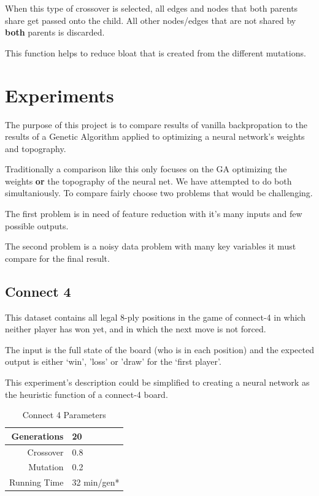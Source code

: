 \documentclass[journal]{IEEEtran}
\begin{document}
    When this type of crossover is selected, all edges and nodes that both parents share get
    passed onto the child. All other nodes/edges that are not shared by \textbf{both} parents
    is discarded. 
    
    This function helps to reduce bloat that is created from the different mutations.
    
\section{Experiments}
  The purpose of this project is to compare results of vanilla backpropation to the results of
  a Genetic Algorithm applied to optimizing a neural network's weights and topography. 
  
  Traditionally a comparison like this only focuses on the GA optimizing the weights \textbf{or}
  the topography of the neural net. We have attempted to do both simultaniously. To compare fairly
  choose two problems that would be challenging.
  
  The first problem is in need of feature reduction with it's many inputs and few possible outputs.
  
  The second problem is a noisy data problem with many key variables it must compare for the final
  result.

  \subsection{Connect 4}
   This dataset contains all legal 8-ply positions in the game of
   connect-4 in which neither player has won yet, and in which the next
   move is not forced.    
   
   The input is the full state of the board (who is in each position) and the expected output
   is either `win', 'loss' or 'draw' for the `first player'.
   
   This experiment's description could be simplified to creating a neural network as the heuristic
   function of a connect-4 board.
   
   \begin{table}[here]
    \renewcommand{\arraystretch}{1.3}
    \caption{Connect 4 Parameters}
    \label{E1}
    \centering
    \begin{tabular}{r||l}
      \hline
      Generations & 20  \\ \hline
      Crossover   & 0.8 \\ \hline
      Mutation    & 0.2 \\ \hline
      Running Time & 32 min/gen* \\ \hline
    \end{tabular}
   \end{table}
    
\end{document}
